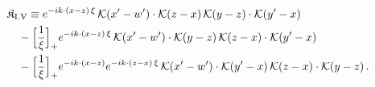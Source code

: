 \begin{align}\label{eq:K-rm_I_V}
&\mathfrak{K}_{\rm I.V}\equiv e^{-ik\cdot(x-z)\,\xi}\, \mathcal{K}(x'-w')\cdot\mathcal{K}(z-x)\, \mathcal{K}(y-z)\cdot\mathcal{K}(y'-x)\notag\\
&\quad -\Big[\frac{1}{\xi}\Big]_{+}e^{-ik\cdot(x-z)\,\xi}\, \mathcal{K}(x'-w')\cdot\mathcal{K}(y-z)\, \mathcal{K}(z-x)\cdot\mathcal{K}(y'-x)\notag\\
&\quad -\Big[\frac{1}{\xi}\Big]_{+}e^{-ik\cdot(x-z)}e^{-ik\cdot(z-x)\,\xi}\, \mathcal{K}(x'-w')\cdot\mathcal{K}(y'-x)\, \mathcal{K}(z-x)\cdot\mathcal{K}(y-z)\,.
\end{align}
